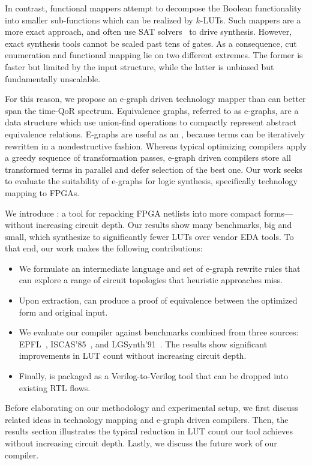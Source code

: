 In contrast, functional mappers attempt to decompose the Boolean functionality
into smaller sub-functions which can be realized by $k$-LUTs. Such mappers are
a more exact approach, and often use SAT solvers~\cite{satmap,satmap2} to drive
synthesis. 
However, exact synthesis tools cannot be scaled past tens of gates. As a
consequence, cut enumeration and functional mapping lie on two different
extremes. The former is faster but limited by the input structure, while the
latter is unbiased but fundamentally unscalable.

For this reason, we propose an e-graph driven technology mapper than can better
span the time-QoR spectrum. Equivalence graphs,  referred to as e-graphs, are a data structure which use
union-find operations to compactly represent abstract equivalence relations.
E-graphs are useful as an ,  because terms can be iteratively rewritten in a nondestructive
fashion. Whereas typical optimizing compilers apply a greedy sequence of
transformation passes, e-graph driven compilers store all transformed terms in
parallel and defer selection of the best one. Our work seeks to evaluate the
suitability of e-graphs for logic synthesis, specifically technology mapping to
FPGAs.

We introduce \shortname{}: a tool for repacking FPGA netlists into more compact
forms---without increasing circuit depth. Our results show many benchmarks, big
and small, which synthesize to significantly fewer LUTs over vendor EDA tools.
To that end, our work makes the following contributions:

\begin{itemize}
    \item We formulate an intermediate language and set of e-graph rewrite rules that can
          explore a range of circuit topologies that heuristic approaches miss.
    \item Upon extraction, \shortname{} can produce a proof of equivalence between the
          optimized form and original input.
    \item We evaluate our compiler against \nbenchmarks{} benchmarks combined from three
          sources: EPFL~\cite{epflbench}, ISCAS'85~\cite{iscasbench}, and
          LGSynth'91~\cite{lgsynthbench}. The results show significant improvements in
          LUT count without increasing circuit depth.
    \item Finally, \shortname{} is packaged as a Verilog-to-Verilog tool that can be
          dropped into existing RTL flows.
\end{itemize}

Before elaborating on our methodology and experimental setup, we first discuss
related ideas in technology mapping and e-graph driven compilers. Then, the
results section illustrates the typical reduction in LUT count our tool
achieves without increasing circuit depth. Lastly, we discuss the future work
of our compiler.